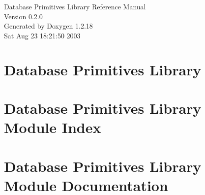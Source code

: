\documentclass[letterpaper]{book}
\begin{document}
\begin{titlepage}
\vspace*{7cm}
\begin{center}
{\Large Database Primitives Library Reference Manual\\[1ex]\large Version 0.2.0}\\
\vspace*{1cm}
{\large Generated by Doxygen 1.2.18}\\
\vspace*{0.5cm}
{\small Sat Aug 23 18:21:50 2003}\\
\end{center}
\end{titlepage}
\clearemptydoublepage
{}
\tableofcontents
\clearemptydoublepage
{}
\chapter{Database Primitives Library}
\label{index}\hypertarget{index}{}
\chapter{Database Primitives Library Module Index}

\chapter{Database Primitives Library Module Documentation}





\printindex
\end{document}
